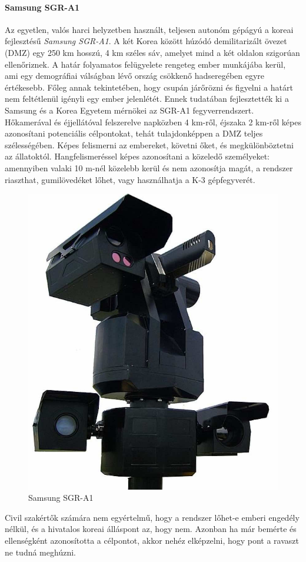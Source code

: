 \documentclass[12pt,a4paper]{article}
\begin{document}
\paragraph{Samsung SGR-A1 \cite{samsung}}
Az egyetlen, valós harci helyzetben használt, teljesen autonóm gépágyú a koreai fejlesztésű \textsl{Samsung SGR-A1}. A két Korea között húzódó demilitarizált övezet (DMZ) egy 250 km hosszú, 4 km széles sáv, amelyet mind a két oldalon szigorúan ellenőriznek. A határ folyamatos felügyelete rengeteg ember munkájába kerül, ami egy demográfiai válságban lévő ország csökkenő hadseregében egyre értékesebb. Főleg annak tekintetében, hogy csupán járőrözni és figyelni a határt nem feltétlenül igényli egy ember jelenlétét. Ennek tudatában fejlesztették ki a Samsung és a Korea Egyetem mérnökei az SGR-A1 fegyverrendszert. Hőkamerával és éjjellátóval felszerelve napközben 4 km-ről, éjszaka 2 km-ről képes azonosítani potenciális célpontokat, tehát tulajdonképpen a DMZ teljes szélességében. Képes felismerni az embereket, követni őket, és megkülönböztetni az állatoktól. Hangfelismeréssel képes azonosítani a közeledő személyeket: amennyiben valaki 10 m-nél közelebb kerül és nem azonosítja magát, a rendszer riaszthat, gumilövedéket lőhet, vagy használhatja a K-3 gépfegyverét.

\begin{figure}[h!]
	\centering
	\includegraphics[width=0.5\linewidth]{irod_samsung}
	\caption{Samsung SGR-A1 \cite{samsung}}
	\label{fig:irod_samsung}
\end{figure}

Civil szakértők számára nem egyértelmű, hogy a rendszer lőhet-e emberi engedély nélkül, és a hivatalos koreai álláspont az, hogy nem. Azonban ha már bemérte és ellenségként azonosította a célpontot, akkor nehéz elképzelni, hogy pont a ravaszt ne tudná meghúzni.
\end{document}
